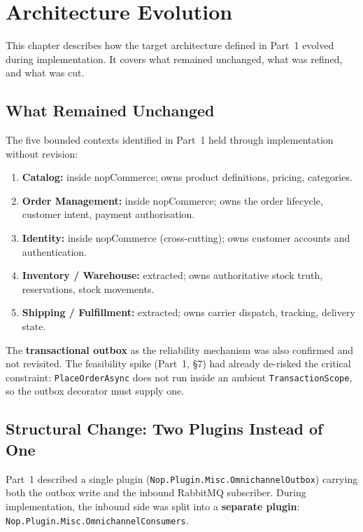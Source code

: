 \chapter{Architecture Evolution}
\label{ch:evolution}

This chapter describes how the target architecture defined in Part~1 evolved during implementation. It covers what remained unchanged, what was refined, and what was cut.

\section{What Remained Unchanged}

The five bounded contexts identified in Part~1 held through implementation without revision:

\begin{enumerate}
    \item \textbf{Catalog:} inside nopCommerce; owns product definitions, pricing, categories.
    \item \textbf{Order Management:} inside nopCommerce; owns the order lifecycle, customer intent, payment authorisation.
    \item \textbf{Identity:} inside nopCommerce (cross-cutting); owns customer accounts and authentication.
    \item \textbf{Inventory / Warehouse:} extracted; owns authoritative stock truth, reservations, stock movements.
    \item \textbf{Shipping / Fulfillment:} extracted; owns carrier dispatch, tracking, delivery state.
\end{enumerate}

The \textbf{transactional outbox} as the reliability mechanism was also confirmed and not revisited. The feasibility spike (Part~1, \S7) had already de-risked the critical constraint: \texttt{PlaceOrderAsync} does not run inside an ambient \texttt{TransactionScope}, so the outbox decorator must supply one.

\section{Structural Change: Two Plugins Instead of One}

Part~1 described a single plugin (\texttt{Nop.Plugin.Misc.OmnichannelOutbox}) carrying both the outbox write and the inbound RabbitMQ subscriber. During implementation, the inbound side was split into a \textbf{separate plugin}: \texttt{Nop.Plugin.Misc.OmnichannelConsumers}.

